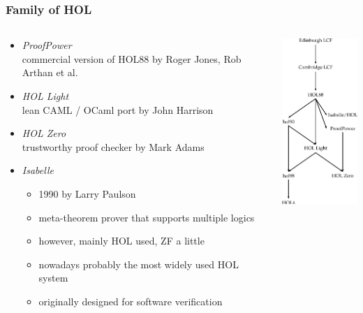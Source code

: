 \begin{frame}
\frametitle{Family of HOL}
\begin{columns}
\begin{column}{.65\textwidth}
\begin{itemize}
\item \emph{ProofPower}\\commercial version of HOL88 by Roger Jones, Rob Arthan et al.
\item \emph{HOL Light}\\lean CAML / OCaml port by John Harrison
\item \emph{HOL Zero}\\trustworthy proof checker by Mark Adams
\item \emph{Isabelle}
\begin{itemize}
\item 1990 by Larry Paulson
\item meta-theorem prover that supports multiple logics
\item however, mainly HOL used, ZF a little
\item nowadays probably the most widely used HOL system
\item originally designed for software verification
\end{itemize}
\end{itemize}
\end{column}
\qquad
\begin{column}{.3\textwidth}
\includegraphics[width=3.2cm]{images/hol-family}
\end{column}
\end{columns}

\end{frame}

